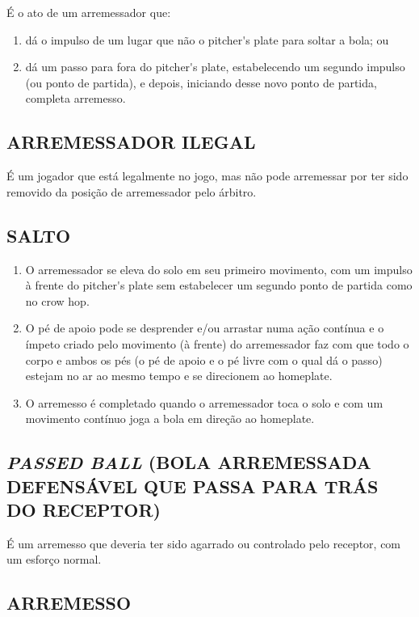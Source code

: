  É o ato de um arremessador que:
\begin{enumerate}[label=(\alph*)]
	\item dá o impulso de um lugar que não o \gls{pitcher's plate} para soltar a bola; ou
	\item dá um passo para fora do \gls{pitcher's plate}, estabelecendo um segundo impulso (ou ponto de partida), e depois, iniciando desse novo ponto de partida, completa arremesso.
\end{enumerate}
\subsection{ARREMESSADOR ILEGAL}

 É um jogador que está legalmente no jogo, mas não pode arremessar por ter sido removido da posição de arremessador pelo árbitro.

\subsection{SALTO}

\begin{enumerate}[label=(\alph*)]
	\item O arremessador se eleva do solo em seu primeiro movimento, com um impulso à frente do \gls{pitcher's plate} sem estabelecer um segundo ponto de partida como no \gls{crow hop}.
	\item O pé de apoio pode se desprender e/ou arrastar numa ação contínua e o ímpeto criado pelo movimento (à frente) do arremessador faz com que todo o corpo e ambos os pés (o pé de apoio e o pé livre com o qual dá o passo) estejam no ar ao mesmo tempo e se direcionem ao \gls{homeplate}.
 	\item O arremesso é completado quando o arremessador toca o solo e com um movimento contínuo joga a bola em direção ao \gls{homeplate}.

\end{enumerate}

\subsection{\textit{PASSED BALL} (BOLA ARREMESSADA DEFENSÁVEL QUE PASSA PARA TRÁS DO RECEPTOR)}

 É um arremesso que deveria ter sido agarrado ou controlado pelo receptor, com um esforço normal.

\subsection{ARREMESSO}

